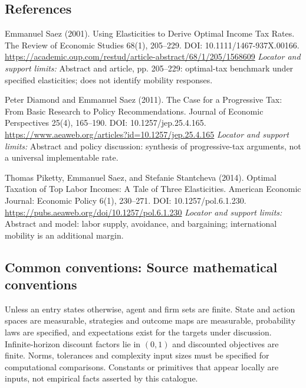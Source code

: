 \documentclass[11pt,a4paper]{article}
\begin{document}
\subsection*{References}
\begin{enumerate}[label={[S\arabic*]},leftmargin=*,itemsep=0.6em]
\item Emmanuel Saez (2001). Using Elasticities to Derive Optimal Income Tax Rates. The Review of Economic Studies 68(1), 205--229. DOI: 10.1111/1467-937X.00166.
\url{https://academic.oup.com/restud/article-abstract/68/1/205/1568609}
\newline\emph{Locator and support limits:} Abstract and article, pp. 205--229: optimal-tax benchmark under specified elasticities; does not identify mobility responses.
\item Peter Diamond and Emmanuel Saez (2011). The Case for a Progressive Tax: From Basic Research to Policy Recommendations. Journal of Economic Perspectives 25(4), 165--190. DOI: 10.1257/jep.25.4.165.
\url{https://www.aeaweb.org/articles?id=10.1257/jep.25.4.165}
\newline\emph{Locator and support limits:} Abstract and policy discussion: synthesis of progressive-tax arguments, not a universal implementable rate.
\item Thomas Piketty, Emmanuel Saez, and Stefanie Stantcheva (2014). Optimal Taxation of Top Labor Incomes: A Tale of Three Elasticities. American Economic Journal: Economic Policy 6(1), 230--271. DOI: 10.1257/pol.6.1.230.
\url{https://pubs.aeaweb.org/doi/10.1257/pol.6.1.230}
\newline\emph{Locator and support limits:} Abstract and model: labor supply, avoidance, and bargaining; international mobility is an additional margin.
\end{enumerate}

\subsection*{Common conventions: Source mathematical conventions}

Unless an entry states otherwise, agent and firm sets are finite. State and action spaces are measurable, strategies and outcome maps are measurable, probability laws are specified, and expectations exist for the targets under discussion. Infinite-horizon discount factors lie in $(0,1)$ and discounted objectives are finite. Norms, tolerances and complexity input sizes must be specified for computational comparisons. Constants or primitives that appear locally are inputs, not empirical facts asserted by this catalogue.
\end{document}
